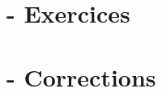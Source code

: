 

\newpage

\section*{\titre - Exercices}





\setcounter{exrcntr}{0}

\newpage

\section*{\titre - Corrections}





